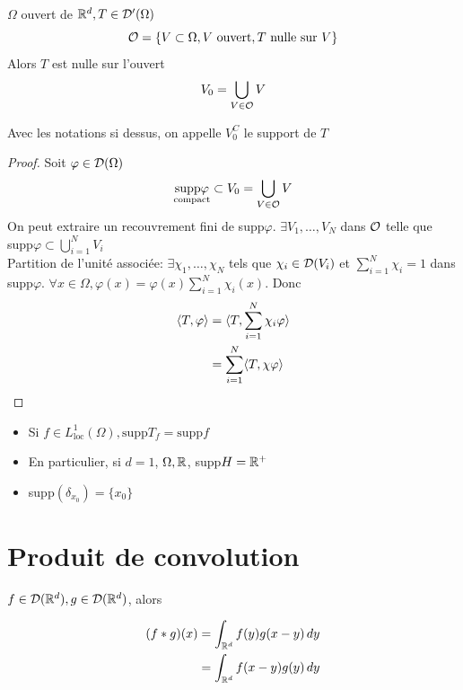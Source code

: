 \documentclass[]{report}
\begin{document}
    \begin{prop}{}{}
        $\Omega$ ouvert de $\mathbb{R}^d,T\in \mathcal{D}'(\Omega)$
        \[\mathcal{O}=\{V\subset \Omega,V\text{ ouvert}, T\text{ nulle sur $V$}\}\]
        Alors $T$ est nulle sur l'ouvert
        \[V_0=\bigcup_{V\in \mathcal{O}}V\]
    \end{prop}

    \begin{df}{}{}
        Avec les notations si dessus, on appelle $V_0^C$ le support de $T$
    \end{df}

    \begin{proof}
        Soit $\varphi\in \mathcal{D}(\Omega)$
        \[\underset{\text{compact}}{\text{supp}\varphi} \subset V_0=\bigcup_{V\in \mathcal{O}}V\]
        On peut extraire un recouvrement fini de supp$\varphi$. $\exists V_1,\ldots,V_N$ dans $\mathcal{O}$ telle que supp$\varphi \subset \bigcup_{i=1}^N V_i$\\
        Partition de l'unité associée: $\exists \chi_1,\ldots,\chi_N$ tels que $\chi_i \in \mathcal{D}(V_i)$ et $\sum_{i=1}^{N}\chi_i=1$ dans supp$\varphi$. $\forall x\in \Omega,\varphi(x)=\varphi(x)\sum_{i=1}^{N}\chi_i(x)$. Donc
        \begin{align*}
            \langle T,\varphi \rangle&=\langle T,\sum_{i=1}^{N}\chi_i \varphi \rangle\\
            &=\sum_{i=1}^{N}\langle T,\chi\varphi \rangle
        \end{align*}
    \end{proof}

    \begin{ex}{}{}
        \begin{itemize}
            \item Si $f\in L^1_{\text{loc}}(\Omega), \text{supp}T_f=\text{supp}f$
            \item En particulier, si $d=1$, $\Omega,\mathbb{R}$, supp$H=\mathbb{R}^+$
            \item supp$(\delta_{x_0})=\{x_0\}$
        \end{itemize}
    \end{ex}

    \section{Produit de convolution}

    $f\in \mathcal{D}(\mathbb{R}^d),g\in \mathcal{D}(\mathbb{R}^d)$, alors

    \begin{align*}
        (f*g)(x)&=\int_{\mathbb{R}^d}f(y) g(x-y)\, dy\\
        &=\int_{\mathbb{R}^d} f(x-y)g(y)\, dy
    \end{align*}
\end{document}

